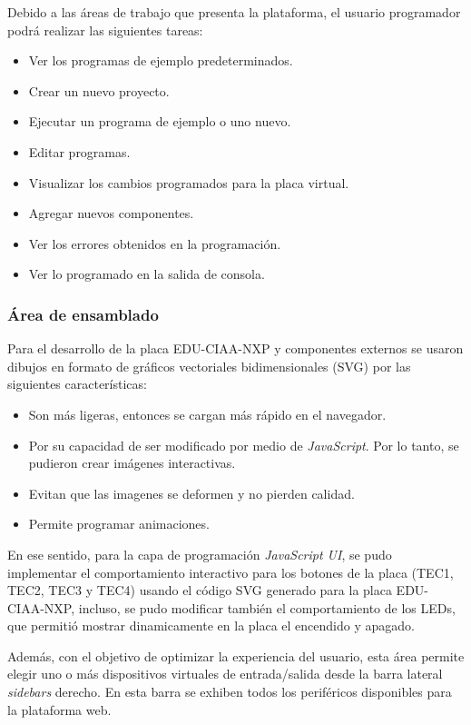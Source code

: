 Debido a las áreas de trabajo que presenta la plataforma, el
usuario programador podrá realizar las siguientes tareas:

\begin{itemize}
	\item Ver los programas de ejemplo predeterminados.
	\item Crear un nuevo proyecto.
	\item Ejecutar un programa de ejemplo o uno nuevo.
	\item Editar programas.
	\item Visualizar los cambios programados para la placa virtual.
	\item Agregar nuevos componentes.
	\item Ver los errores obtenidos en la programación.
	\item Ver lo programado en la salida de consola.
\end{itemize}

\subsubsection{Área de ensamblado}

Para el desarrollo de la placa EDU-CIAA-NXP y componentes externos se usaron dibujos en formato de gráficos vectoriales bidimensionales (SVG) por las siguientes características:

\begin{itemize}
	\item Son más ligeras, entonces se cargan más rápido en el navegador.
    \item Por su capacidad de ser modificado por medio de \textit{JavaScript}. Por lo tanto, se pudieron crear imágenes interactivas.
	\item Evitan que las imagenes se deformen y no pierden calidad.
	\item Permite programar animaciones.
\end{itemize}

En ese sentido, para la capa de programación \textit{JavaScript UI}, se pudo implementar el comportamiento interactivo para los botones de la placa (TEC1, TEC2, TEC3 y TEC4) usando el código SVG generado para la placa EDU-CIAA-NXP, incluso, se pudo modificar también el comportamiento de los LEDs, que permitió mostrar dinamicamente en la placa el encendido y apagado.

Además, con el objetivo de optimizar la experiencia del usuario, esta área permite elegir uno o más dispositivos virtuales de entrada/salida desde la barra lateral \textit{sidebars} derecho. En esta barra se exhiben todos los periféricos disponibles para la plataforma web. 

